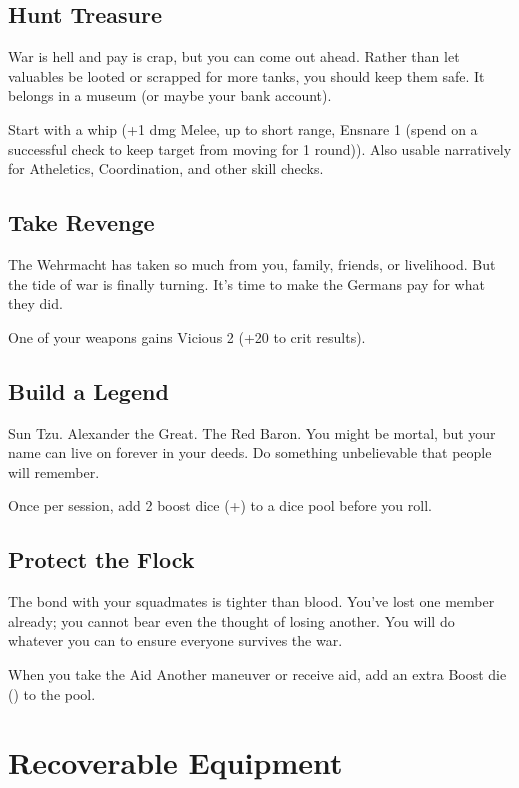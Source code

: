 \documentclass{book}
\newcommand{\bbb}{\BoostDie}
\begin{document}
\begin{multicols}{2}
\subsection{Hunt Treasure}

War is hell and pay is crap, but you can come out ahead.  Rather than let valuables be looted or scrapped for more tanks, you should keep them safe.  It belongs in a museum (or maybe your bank account).

Start with a whip (+1 dmg Melee, up to short range, Ensnare 1 (spend \Advantage\Advantage on a successful check to keep target from moving for 1 round)).  Also usable narratively for Atheletics, Coordination, and other skill checks.

\subsection{Take Revenge}

The Wehrmacht has taken so much from you, family, friends, or livelihood.  But the tide of war is finally turning.  It's time to make the Germans pay for what they did.

One of your weapons gains Vicious 2 (+20 to crit results).

\subsection{Build a Legend}

Sun Tzu.  Alexander the Great.  The Red Baron.  You might be mortal, but your name can live on forever in your deeds.  Do something unbelievable that people will remember.

Once per session, add 2 boost dice (+\bbb\bbb) to a dice pool before you roll.

\subsection{Protect the Flock}

The bond with your squadmates is tighter than blood.  You've lost one member already; you cannot bear even the thought of losing another.  You will do whatever you can to ensure everyone survives the war.

When you take the Aid Another maneuver or receive aid, add an extra Boost die (\bbb) to the pool.

\section{Recoverable Equipment}


\end{multicols}
\end{document}
